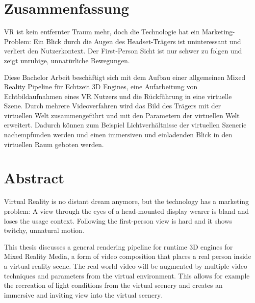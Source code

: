 %
\chapter*{Zusammenfassung}
\label{sec:abstract}
\vspace*{-10mm}

VR ist kein entfernter Traum mehr, doch die Technologie hat ein 
Marketing-Problem: Ein Blick durch die Augen des Headset-Trägers ist 
uninteressant und verliert den Nutzerkontext. Der First-Person Sicht ist nur 
schwer zu folgen und zeigt unruhige, unnatürliche Bewegungen.

Diese Bachelor Arbeit beschäftigt sich mit dem Aufbau einer allgemeinen Mixed 
Reality Pipeline für Echtzeit 3D Engines, eine Aufarbeitung von 
Echtbildaufnahmen eines VR Nutzers und die Rückführung in eine virtuelle Szene. 
Durch mehrere Videoverfahren wird das Bild des Trägers mit der virtuellen Welt 
zusammengeführt und mit den Parametern der virtuellen Welt erweitert.
\newline
Dadurch können zum Beispiel Lichtverhältnisse der virtuellen Szenerie 
nachempfunden werden und einen immersiven und einladenden Blick in den 
virtuellen Raum geboten werden.
\vfill
\begin{center}
	\hrulefill
\end{center}

\vspace*{-20mm}
{\let\clearpage\relax\chapter*{Abstract}}
\vspace*{-10mm}

Virtual Reality is no distant dream anymore, but the technology has a 
marketing problem: A view through the eyes of a head-mounted display wearer 
is bland and loses the usage context. Following the first-person view is hard 
and it shows twitchy, unnatural motion.

This thesis discusses a general rendering pipeline for runtime 3D engines for 
Mixed Reality Media, a form of video composition that places a real person 
inside a virtual reality scene. The real world video will be augmented by 
multiple video techniques and parameters from the virtual environment.
\newline
This allows for example the recreation of light conditions from the virtual 
scenery and creates an immersive and inviting view into the virtual scenery.